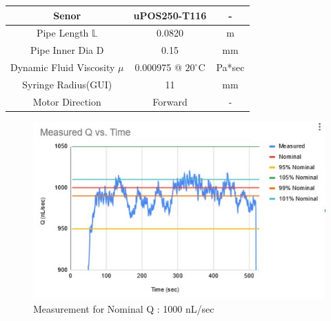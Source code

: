 \documentclass[journal]{IEEEtran}
\begin{document}
\begin{table}[H]
\begin{center}
\begin{tabular}{|c|c|c|}
                                Senor&
                                uPOS250-T116&
                                -
                                \\ \hline
                                
                                Pipe Length \(\mathbb{L}\) &
                                0.0820&
                                m
                                \\ \hline
                                
                                Pipe Inner Dia D&
                                0.15&
                                mm
                                \\ \hline
                                
                                Dynamic Fluid Viscosity \(\mu\) &
                                0.000975 @ \(20^\circ\)C&
                                Pa*sec
                                \\ \hline
                                
                                
                                Syringe Radius(GUI)&
                                11&
                                mm
                                \\ \hline
                                
                                Motor Direction&
                                Forward&
                                -
                                \\ \hline
                                
                            \end{tabular}
                        \end{center}
                    \end{table}
            
            \begin{figure}[H]
                \centering
                \includegraphics[scale = 0.65]{T8}
                \caption{Measurement for Nominal Q : 1000 nL/sec}
                \label{fig:T8}
            \end{figure}
            
\end{document}
